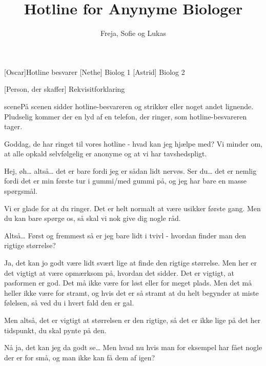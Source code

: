 \documentclass[a4paper,11pt]{article}
\title{Hotline for Anynyme Biologer}
\author{Freja, Sofie og Lukas}
\begin{document}
\maketitle

\begin{roles}
 [Oscar]Hotline besvarer
 [Nethe] Biolog 1 
 [Astrid] Biolog 2 

\end{roles}

\begin{props}
    [Person, der skaffer] Rekvisitforklaring
\end{props}


\begin{sketch}


scene{På scenen sidder hotline-besvareren og strikker eller noget andet lignende. Pludselig kommer der en lyd af en telefon, der ringer, som hotline-besvareren tager.}

 Goddag, de har ringet til vores hotline - hvad kan jeg hjælpe med? Vi minder om, at alle opkald selvfølgelig er anonyme og at vi har tavshedspligt.

 Hej, øh… altså… det er bare fordi jeg er sådan lidt nervøs. Ser du… det er nemlig fordi det er min første tur i gummi/med gummi på, og jeg har bare en masse spørgsmål.

 Vi er glade for at du ringer. Det er helt normalt at være usikker første gang. Men du kan bare spørge os, så skal vi nok give dig nogle råd.

 Altså… Først og fremmest så er jeg bare lidt i tvivl - hvordan finder man den rigtige størrelse?

 Ja, det kan jo godt være lidt svært lige at finde den rigtige størrelse. Men her er det vigtigt at være opmærksom på, hvordan det sidder. Det er vigtigt, at pasformen er god. Det må ikke være for løst eller for meget plads. Men det må heller ikke være for stramt, og hvis det er så stramt at du helt begynder at miste følelsen, så ved du i hvert fald den er gal.

 Men altså, det er vigtigt at størrelsen er den rigtige, så det er ikke lige på det her tidspunkt, du skal pynte på den.

 Nå ja, det kan jeg da godt se… Men hvad nu hvis man for eksempel har fået nogle der er for små, og man ikke kan få dem af igen?


\end{sketch}
\end{document}

